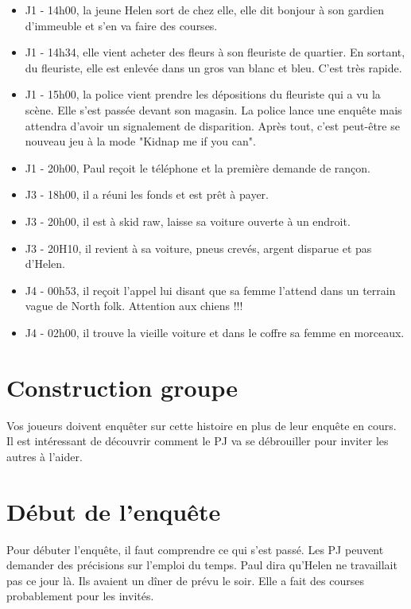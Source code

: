 \documentclass[10pt,a5paper,oneside]{book}
\begin{document}
\begin{itemize}
\item J1 - 14h00, la jeune Helen sort de chez elle, elle dit bonjour à son gardien d'immeuble et s'en va faire des courses.
\item J1 - 14h34, elle vient acheter des fleurs à son fleuriste de quartier. En sortant, du fleuriste, elle est enlevée dans un gros van blanc et bleu. C'est très rapide. 
\item J1 - 15h00, la police vient prendre les dépositions du fleuriste qui a vu la scène. Elle s'est passée devant son magasin. La police lance une enquête mais attendra d'avoir un signalement de disparition. Après tout, c'est peut-être se nouveau jeu à la mode "Kidnap me if you can". 
\item J1 - 20h00, Paul reçoit le téléphone et la première demande de rançon. 
\item J3 - 18h00, il a réuni les fonds et est prêt à payer.
\item J3 - 20h00, il est à skid raw, laisse sa voiture ouverte à un endroit. 
\item J3 - 20H10, il revient à sa voiture, pneus crevés, argent disparue et pas d’Helen.
\item J4 - 00h53, il reçoit l'appel lui disant que sa femme l’attend dans un terrain vague de North folk.  Attention aux chiens !!!
\item J4 - 02h00, il trouve la vieille voiture et dans le coffre sa femme en morceaux.
\end{itemize}


\section{Construction groupe}

Vos joueurs doivent enquêter sur cette histoire en plus de leur enquête en cours. 
Il est intéressant de découvrir comment le PJ va se débrouiller pour inviter les autres à l'aider.

\section{Début de l'enquête}

Pour débuter l’enquête, il faut comprendre ce qui s'est passé. Les PJ peuvent demander des précisions sur l'emploi du temps. Paul dira qu’Helen ne travaillait pas ce jour là. 
Ils avaient un dîner de prévu le soir. Elle a fait des courses probablement pour les invités. 
\end{document}
